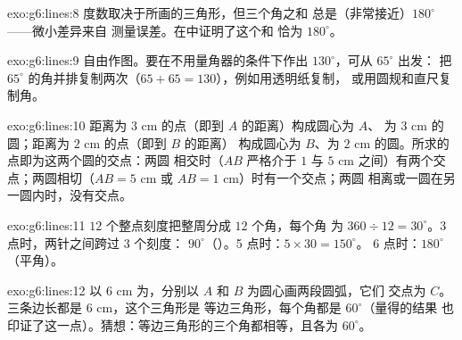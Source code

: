 \begin{solution}{exo:g6:lines:8}
度数取决于所画的三角形，但三个角之和
总是（非常接近）$180^\circ$——微小差异来自
测量误差。在中证明了这个和
恰为 $180^\circ$。
\end{solution}

\begin{solution}{exo:g6:lines:9}
自由作图。要在不用量角器的条件下作出 $130^\circ$，可从 $65^\circ$ 出发：
把 $65^\circ$ 的角并排复制两次（$65 + 65 =
130$），例如用透明纸复制，
或用圆规和直尺复制角。
\end{solution}

\begin{solution}{exo:g6:lines:10}
距离为 $3$ cm 的点（即到 $A$ 的距离）构成圆心为 $A$、
为 $3$ cm 的圆；距离为 $2$ cm 的点（即到 $B$ 的距离）
构成圆心为 $B$、为 $2$ cm 的圆。所求的点即为这两个圆的交点：两圆
相交时（$AB$ 严格介于 $1$ 与
$5$ cm 之间）有两个交点；两圆相切（$AB = 5$ cm 或 $AB = 1$ cm）时有一个交点；两圆
相离或一圆在另一圆内时，没有交点。
\end{solution}

\begin{solution}{exo:g6:lines:11}
$12$ 个整点刻度把整周分成 $12$ 个角，每个角
为 $360 \div 12 = 30^\circ$。3 点时，两针之间跨过 $3$ 个刻度：
$90^\circ$（）。5 点时：$5 \times 30 = 150^\circ$。
6 点时：$180^\circ$（平角）。
\end{solution}

\begin{solution}{exo:g6:lines:12}
以 $6$ cm 为，分别以 $A$ 和 $B$ 为圆心画两段圆弧，它们
交点为 $C$。三条边长都是 $6$ cm，这个三角形是
等边三角形，每个角都是 $60^\circ$（量得的结果
也印证了这一点）。猜想：等边三角形的三个角都相等，且各为
$60^\circ$。
\end{solution}

